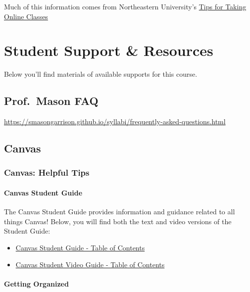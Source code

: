 Much of this information comes from Northeastern University's \href{https://www.northeastern.edu/graduate/blog/tips-for-taking-online-classes/}{Tips for Taking Online Classes}

\hypertarget{student-support-resources}{%
\chapter{Student Support \& Resources}\label{student-support-resources}}

Below you'll find materials of available supports for this course.

\hypertarget{prof.-mason-faq}{%
\section{Prof.~Mason FAQ}\label{prof.-mason-faq}}

\url{https://smasongarrison.github.io/syllabi/frequently-asked-questions.html}

\hypertarget{canvas}{%
\section{Canvas}\label{canvas}}

\hypertarget{canvas-helpful-tips}{%
\subsection{Canvas: Helpful Tips}\label{canvas-helpful-tips}}

\hypertarget{canvas-student-guide}{%
\subsubsection{Canvas Student Guide}\label{canvas-student-guide}}

The Canvas Student Guide provides information and guidance related to all things Canvas! Below, you will find both the text and video versions of the Student Guide:

\begin{itemize}
\item
  \href{https://community.canvaslms.com/t5/Student-Guide/tkb-p/student}{Canvas Student Guide - Table of Contents}
\item
  \href{https://community.canvaslms.com/t5/Student-Guide/tkb-p/student}{Canvas Student Video Guide - Table of Contents}
\end{itemize}

\hypertarget{getting-organized}{%
\subsubsection{Getting Organized}\label{getting-organized}}

